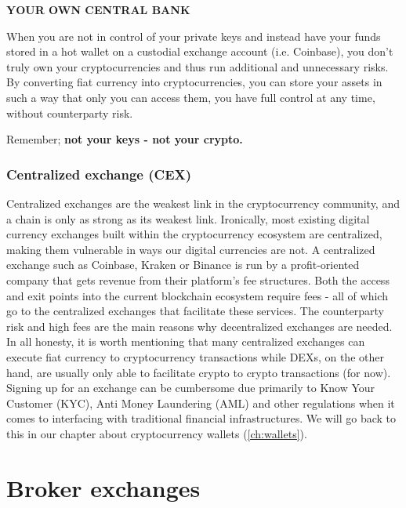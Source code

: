\medskip

\begin{cryptobox}{\textbf{YOUR OWN CENTRAL BANK}}

When you are not in control of your private keys and instead have your funds stored in a hot wallet on a custodial exchange account (i.e. Coinbase), you don't truly own your cryptocurrencies and thus run additional and unnecessary risks. By converting fiat currency into cryptocurrencies, you can store your assets in such a way that only you can access them, you have full control at any time, without counterparty risk.

\tcblower
Remember; \textbf{not your keys - not your crypto.}

\end{cryptobox}

\medskip

\subsubsection{Centralized exchange (CEX)}
Centralized exchanges are the weakest link in the cryptocurrency community, and a chain is only as strong as its weakest link. Ironically, most existing digital currency exchanges built within the cryptocurrency ecosystem are centralized, making them vulnerable in ways our digital currencies are not.
A centralized exchange such as Coinbase, Kraken or Binance is run by a profit-oriented company that gets revenue from their platform's fee structures. Both the access and exit points into the current blockchain ecosystem require fees - all of which go to the centralized exchanges that facilitate these services. The counterparty risk and high fees are the main reasons why decentralized exchanges are needed. In all honesty, it is worth mentioning that many centralized exchanges can execute fiat currency to cryptocurrency transactions while DEXs, on the other hand, are usually only able to facilitate crypto to crypto transactions (for now). Signing up for an exchange can be cumbersome due primarily to Know Your Customer (KYC), Anti Money Laundering (AML) and other regulations when it comes to interfacing with traditional financial infrastructures. We will go back to this in our chapter about cryptocurrency wallets (\cref{ch:wallets}). 

\medskip

\section{Broker exchanges}
\label{subsec:broker_exchange}


